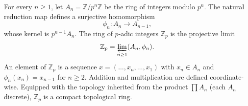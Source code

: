 For every $n \geq 1$, let $A_n = \mathbb{Z}/p^n\mathbb{Z}$ be the ring of integers modulo $p^n$. The natural reduction map defines a surjective homomorphism
$$\phi_n: A_n \rightarrow A_{n-1},$$
whose kernel is $p^{n-1}A_n$. The ring of $p$-adic integers $\mathbb{Z}_p$ is the projective limit
$$\mathbb{Z}_p = \varprojlim_{n \geq 1} (A_n, \phi_n).$$
An element of $\mathbb{Z}_p$ is a sequence $x = (\ldots, x_n, \ldots, x_1)$ with $x_n \in A_n$ and $\phi_n(x_n) = x_{n-1}$ for $n \geq 2$. Addition and multiplication are defined coordinate-wise. Equipped with the topology inherited from the product $\prod A_n$ (each $A_n$ discrete), $\mathbb{Z}_p$ is a compact topological ring.
